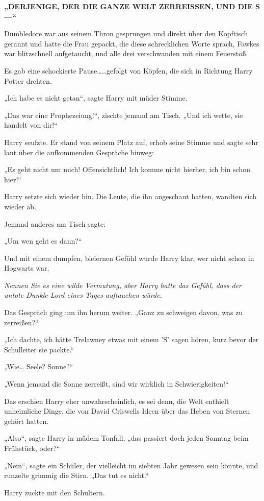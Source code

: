 {\textbf{„DERJENIGE, DER DIE GANZE WELT ZERREISSEN, UND DIE S—“ }

Dumbledore war aus seinem Thron gesprungen und direkt über den Kopftisch gerannt und hatte die Frau gepackt, die diese schrecklichen Worte sprach, Fawkes war blitzschnell aufgetaucht, und alle drei verschwanden mit einem Feuerstoß.

Es gab eine schockierte Pause……gefolgt von Köpfen, die sich in Richtung Harry Potter drehten.

„Ich habe es nicht getan“, sagte Harry mit müder Stimme.

„Das war eine Prophezeiung!“, zischte jemand am Tisch. „Und ich wette, sie handelt von dir!“

Harry seufzte. Er stand von seinem Platz auf, erhob seine Stimme und sagte sehr laut über die aufkommenden Gespräche hinweg:

„Es geht nicht um mich! Offensichtlich! Ich komme nicht hierher, ich bin schon hier!“

Harry setzte sich wieder hin. Die Leute, die ihn angeschaut hatten, wandten sich wieder ab.

Jemand anderes am Tisch sagte:

„Um wen geht es dann?“

Und mit einem dumpfen, bleiernen Gefühl wurde Harry klar, wer nicht schon in Hogwarts war.

\emph{Nennen Sie es eine wilde Vermutung, aber Harry hatte das Gefühl, dass der untote Dunkle Lord eines Tages auftauchen würde.}

Das Gespräch ging um ihn herum weiter. „Ganz zu schweigen davon, was zu zerreißen?“

„Ich dachte, ich hätte Trelawney etwas mit einem 'S' sagen hören, kurz bevor der Schulleiter sie packte.“

„Wie… Seele? Sonne?“

„Wenn jemand die Sonne zerreißt, sind wir wirklich in Schwierigkeiten!“

Das erschien Harry eher unwahrscheinlich, es sei denn, die Welt enthielt unheimliche Dinge, die von David Criswells Ideen über das Heben von Sternen gehört hatten.

„Also“, sagte Harry in müdem Tonfall, „das passiert doch jeden Sonntag beim Frühstück, oder?“

„Nein“, sagte ein Schüler, der vielleicht im siebten Jahr gewesen sein könnte, und runzelte grimmig die Stirn. „Das tut es nicht.“

Harry zuckte mit den Schultern.

}

